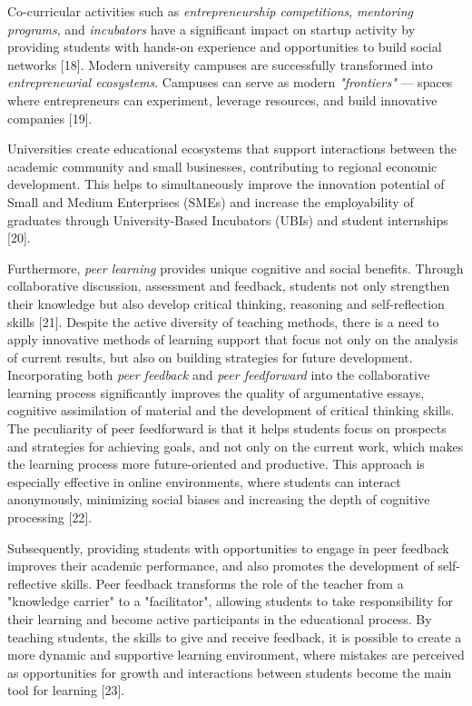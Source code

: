 Co-curricular activities such as \emph{entrepreneurship competitions},
\emph{mentoring programs}, and \emph{incubators} have a significant
impact on startup activity by providing students with hands-on
experience and opportunities to build social networks {[}18{]}. Modern
university campuses are successfully transformed into
\emph{entrepreneurial ecosystems}. Campuses can serve as modern
\emph{"frontiers"} --- spaces where entrepreneurs can experiment,
leverage resources, and build innovative companies {[}19{]}.

Universities create educational ecosystems that support interactions
between the academic community and small businesses, contributing to
regional economic development. This helps to simultaneously improve the
innovation potential of Small and Medium Enterprises (SMEs) and increase
the employability of graduates through University-Based Incubators
(UBIs) and student internships {[}20{]}.

Furthermore, \emph{peer learning} provides unique cognitive and social
benefits. Through collaborative discussion, assessment and feedback,
students not only strengthen their knowledge but also develop critical
thinking, reasoning and self-reflection skills {[}21{]}. Despite the
active diversity of teaching methods, there is a need to apply
innovative methods of learning support that focus not only on the
analysis of current results, but also on building strategies for future
development. Incorporating both \emph{peer feedback} and \emph{peer
feedforward} into the collaborative learning process significantly
improves the quality of argumentative essays, cognitive assimilation of
material and the development of critical thinking skills. The
peculiarity of peer feedforward is that it helps students focus on
prospects and strategies for achieving goals, and not only on the
current work, which makes the learning process more future-oriented and
productive. This approach is especially effective in online
environments, where students can interact anonymously, minimizing social
biases and increasing the depth of cognitive processing {[}22{]}.

Subsequently, providing students with opportunities to engage in peer
feedback improves their academic performance, and also promotes the
development of self-reflective skills. Peer feedback transforms the role
of the teacher from a "knowledge carrier" to a "facilitator", allowing
students to take responsibility for their learning and become active
participants in the educational process. By teaching students, the
skills to give and receive feedback, it is possible to create a more
dynamic and supportive learning environment, where mistakes are
perceived as opportunities for growth and interactions between students
become the main tool for learning {[}23{]}.

